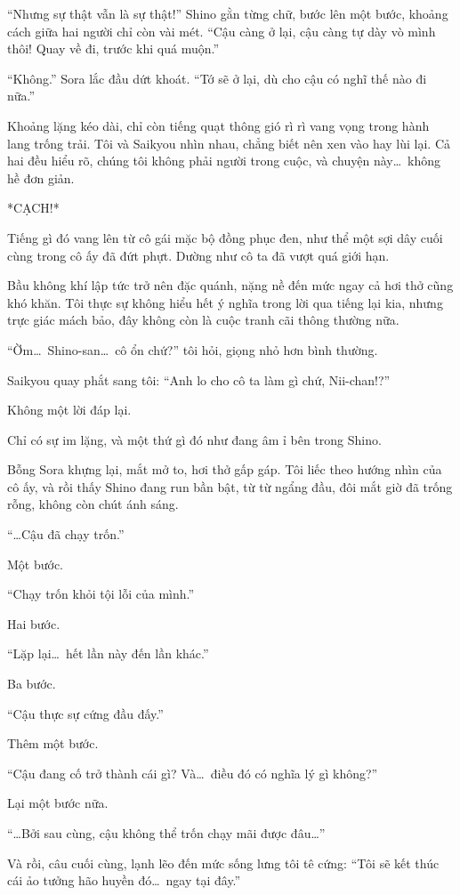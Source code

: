 \documentclass[../main.tex]{subfiles}
\begin{document}
``Nhưng sự thật vẫn là sự thật!'' Shino gằn từng chữ, bước lên một bước, khoảng cách giữa hai người chỉ còn vài mét. ``Cậu càng ở lại, cậu càng tự dày vò mình thôi! Quay về đi, trước khi quá muộn.''

``Không.'' Sora lắc đầu dứt khoát. ``Tớ sẽ ở lại, dù cho cậu có nghĩ thế nào đi nữa.''

Khoảng lặng kéo dài, chỉ còn tiếng quạt thông gió rì rì vang vọng trong hành lang trống trải. Tôi và Saikyou nhìn nhau, chẳng biết nên xen vào hay lùi lại. Cả hai đều hiểu rõ, chúng tôi không phải người trong cuộc, và chuyện này\dots\ không hề đơn giản.

*CẠCH!*

Tiếng gì đó vang lên từ cô gái mặc bộ đồng phục đen, như thể một sợi dây cuối cùng trong cô ấy đã đứt phựt. Dường như cô ta đã vượt quá giới hạn.

Bầu không khí lập tức trở nên đặc quánh, nặng nề đến mức ngay cả hơi thở cũng khó khăn. Tôi thực sự không hiểu hết ý nghĩa trong lời qua tiếng lại kia, nhưng trực giác mách bảo, đây không còn là cuộc tranh cãi thông thường nữa.

``Ờm\dots\ Shino-san\dots\ cô ổn chứ?'' tôi hỏi, giọng nhỏ hơn bình thường.

Saikyou quay phắt sang tôi: ``Anh lo cho cô ta làm gì chứ, Nii-chan!?''

Không một lời đáp lại.

Chỉ có sự im lặng, và một thứ gì đó như đang âm ỉ bên trong Shino.

Bỗng Sora khựng lại, mắt mở to, hơi thở gấp gáp. Tôi liếc theo hướng nhìn của cô ấy, và rồi thấy Shino đang run bần bật, từ từ ngẩng đầu, đôi mắt giờ đã trống rỗng, không còn chút ánh sáng.

``\dots Cậu đã chạy trốn.''

Một bước.

``Chạy trốn khỏi tội lỗi của mình.''

Hai bước.

``Lặp lại\dots\ hết lần này đến lần khác.''

Ba bước.

``Cậu thực sự cứng đầu đấy.''

Thêm một bước.

``Cậu đang cố trở thành cái gì? Và\dots\ điều đó có nghĩa lý gì không?''

Lại một bước nữa.

``\dots Bởi sau cùng, cậu không thể trốn chạy mãi được đâu\dots''

Và rồi, câu cuối cùng, lạnh lẽo đến mức sống lưng tôi tê cứng: ``Tôi sẽ kết thúc cái ảo tưởng hão huyền đó\dots\ ngay tại đây.''
\end{document}
